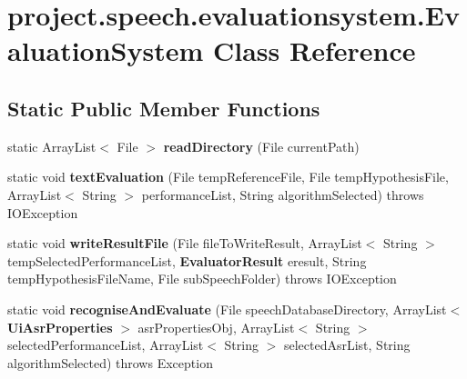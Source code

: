 \section{project.\+speech.\+evaluationsystem.\+Evaluation\+System Class Reference}
\label{classproject_1_1speech_1_1evaluationsystem_1_1_evaluation_system}
\subsection*{Static Public Member Functions}
\begin{DoxyCompactItemize}
\item 
static Array\+List$<$ File $>$ {\bf read\+Directory} (File current\+Path)
\item 
static void {\bf text\+Evaluation} (File temp\+Reference\+File, File temp\+Hypothesis\+File, Array\+List$<$ String $>$ performance\+List, String algorithm\+Selected)  throws I\+O\+Exception 
\item 
static void {\bf write\+Result\+File} (File file\+To\+Write\+Result, Array\+List$<$ String $>$ temp\+Selected\+Performance\+List, {\bf Evaluator\+Result} eresult, String temp\+Hypothesis\+File\+Name, File sub\+Speech\+Folder)  throws I\+O\+Exception
\item 
static void {\bf recognise\+And\+Evaluate} (File speech\+Database\+Directory, Array\+List$<$ {\bf Ui\+Asr\+Properties} $>$ asr\+Properties\+Obj, Array\+List$<$ String $>$ selected\+Performance\+List, Array\+List$<$ String $>$ selected\+Asr\+List, String algorithm\+Selected)  throws Exception 
\end{DoxyCompactItemize}
